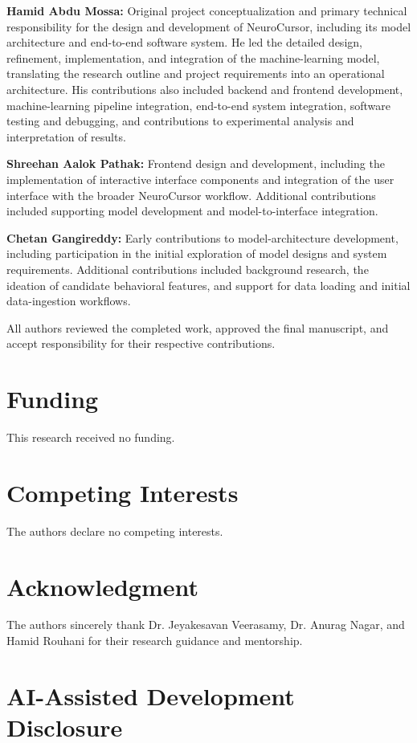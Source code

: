 \documentclass[conference]{IEEEtran}
\begin{document}
\textbf{Hamid Abdu Mossa:} Original project conceptualization and primary
technical responsibility for the design and development of NeuroCursor,
including its model architecture and end-to-end software system. He led the
detailed design, refinement, implementation, and integration of the
machine-learning model, translating the research outline and project
requirements into an operational architecture. His contributions also
included backend and frontend development, machine-learning pipeline
integration, end-to-end system integration, software testing and debugging,
and contributions to experimental analysis and interpretation of results.

\textbf{Shreehan Aalok Pathak:} Frontend design and development, including
the implementation of interactive interface components and integration of
the user interface with the broader NeuroCursor workflow. Additional
contributions included supporting model development and model-to-interface
integration.

\textbf{Chetan Gangireddy:} Early contributions to model-architecture
development, including participation in the initial exploration of model
designs and system requirements. Additional contributions included
background research, the ideation of candidate behavioral features, and
support for data loading and initial data-ingestion workflows.

All authors reviewed the completed work, approved the final manuscript, and
accept responsibility for their respective contributions.

\section*{Funding}
This research received no funding.

\section*{Competing Interests}
The authors declare no competing interests.

\section*{Acknowledgment}
The authors sincerely thank Dr. Jeyakesavan Veerasamy, Dr. Anurag Nagar, and
Hamid Rouhani for their research guidance and mentorship.

\section*{AI-Assisted Development Disclosure}
\end{document}
